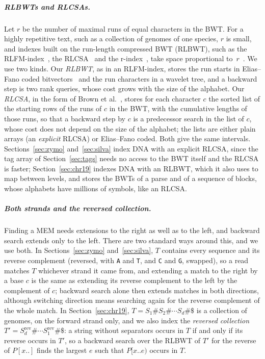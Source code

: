 \subparagraph*{RLBWTs and RLCSAs.}
Let $r$ be the number of maximal runs of equal characters in the BWT.
For a highly repetitive text, such as a collection of genomes of one species, $r$ is small, and indexes built on the run-length compressed BWT (RLBWT), such as the RLFM-index~\cite{MakinenNavarro2005}, the RLCSA~\cite{MakinenEtAl2010} and the r-index~\cite{GagieNavarroPrezza2020}, take space proportional to~$r$~\cite{Navarro2021}.
We use two kinds.
Our \emph{RLBWT}, as in an RLFM-index, stores the run starts in Elias--Fano coded bitvectors~\cite{OkanoharaSadakane2007} and the run characters in a wavelet tree, and a backward step is two rank queries, whose cost grows with the size of the alphabet.
Our \emph{RLCSA}, in the form of Brown et al.~\cite{BrownEtAlRLCSA}, stores for each character $c$ the sorted list of the starting rows of the runs of $c$ in the BWT, with the cumulative lengths of those runs, so that a backward step by $c$ is a predecessor search in the list of $c$, whose cost does not depend on the size of the alphabet; the lists are either plain arrays (an \emph{explicit} RLCSA) or Elias--Fano coded.
Both give the same intervals.
Sections~\ref{sec:zymo} and~\ref{sec:silva} index DNA with an explicit RLCSA, since the tag array of Section~\ref{sec:tags} needs no access to the BWT itself and the RLCSA is faster; Section~\ref{sec:chr19} indexes DNA with an RLBWT, which it also uses to map between levels, and stores the BWTs of a parse and of a sequence of blocks, whose alphabets have millions of symbols, like an RLCSA.

\subparagraph*{Both strands and the reversed collection.}
Finding a MEM needs extensions to the right as well as to the left, and backward search extends only to the left.
There are two standard ways around this, and we use both.
In Sections~\ref{sec:zymo} and~\ref{sec:silva}, $T$ contains every sequence and its reverse complement (reversed, with \texttt{A} and \texttt{T}, and \texttt{C} and \texttt{G}, swapped), so a read matches $T$ whichever strand it came from, and extending a match to the right by a base $c$ is the same as extending its reverse complement to the left by the complement of $c$; backward search alone then extends matches in both directions, although switching direction means searching again for the reverse complement of the whole match.
In Section~\ref{sec:chr19}, $T = S_1 \# S_2 \# \cdots S_d \# \$$ is a collection of genomes, on the forward strand only, and we also index the \emph{reversed collection} $T' = S_d^{\mathrm{rev}} \# \cdots S_1^{\mathrm{rev}} \# \$$: a string without separators occurs in $T$ if and only if its reverse occurs in $T'$, so a backward search over the RLBWT of $T'$ for the reverse of $P[x..]$ finds the largest $e$ such that $P[x..e)$ occurs in $T$.

